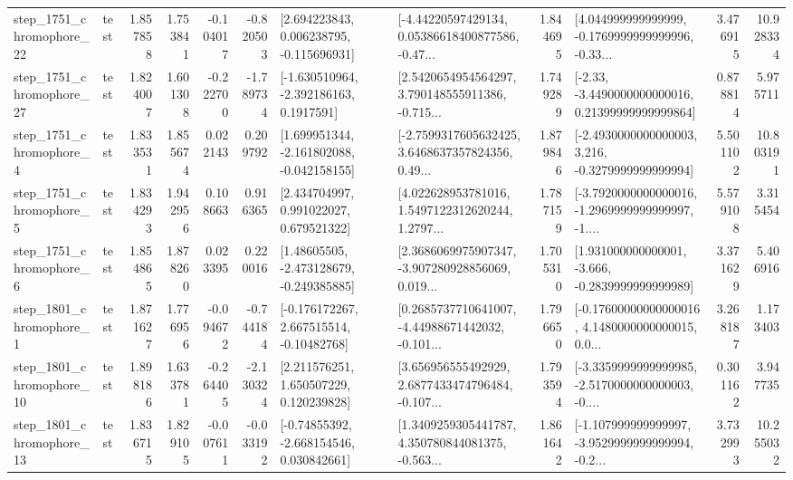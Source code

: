 \begin{tabular}{llrrrrllrlrr}
 step\_1751\_chromophore\_22 &      test &      1.857858 &    1.753841 &     -0.104017 & -0.820503 &    [2.694223843, 0.006238795, -0.115696931] &  [-4.44220597429134, 0.05386618400877586, -0.47... &       1.844695 &  [4.044999999999999, -0.1769999999999996, -0.33... &            3.476915 &         10.928334 \\
 step\_1751\_chromophore\_27 &      test &      1.824007 &    1.601308 &     -0.222700 & -1.789734 &     [-1.630510964, -2.392186163, 0.1917591] &  [2.5420654954564297, 3.790148555911386, -0.715... &       1.749289 &  [-2.33, -3.4490000000000016, 0.21399999999999864] &            0.878814 &          5.975711 \\
  step\_1751\_chromophore\_4 &      test &      1.833531 &    1.855674 &      0.022143 &  0.209792 &   [1.699951344, -2.161802088, -0.042158155] &  [-2.7599317605632425, 3.6468637357824356, 0.49... &       1.879846 &  [-2.4930000000000003, 3.216, -0.3279999999999994] &            5.501102 &         10.803191 \\
  step\_1751\_chromophore\_5 &      test &      1.834293 &    1.942956 &      0.108663 &  0.916365 &     [2.434704997, 0.991022027, 0.679521322] &  [4.022628953781016, 1.5497122312620244, 1.2797... &       1.787159 &  [-3.7920000000000016, -1.2969999999999997, -1.... &            5.579108 &          3.315454 \\
  step\_1751\_chromophore\_6 &      test &      1.854865 &    1.878260 &      0.023395 &  0.220016 &    [1.48605505, -2.473128679, -0.249385885] &  [2.3686069975907347, -3.907280928856069, 0.019... &       1.705310 &   [1.931000000000001, -3.666, -0.2839999999999989] &            3.371629 &          5.406916 \\
  step\_1801\_chromophore\_1 &      test &      1.871627 &    1.776956 &     -0.094672 & -0.744184 &    [-0.176172267, 2.667515514, -0.10482768] &  [0.2685737710641007, -4.44988671442032, -0.101... &       1.796650 &  [-0.17600000000000016, 4.1480000000000015, 0.0... &            3.268187 &          1.173403 \\
 step\_1801\_chromophore\_10 &      test &      1.898186 &    1.633781 &     -0.264405 & -2.130324 &     [2.211576251, 1.650507229, 0.120239828] &  [3.656956555492929, 2.6877433474796484, -0.107... &       1.793594 &  [-3.3359999999999985, -2.5170000000000003, -0.... &            0.301162 &          3.947735 \\
 step\_1801\_chromophore\_13 &      test &      1.836715 &    1.829105 &     -0.007611 & -0.033192 &    [-0.74855392, -2.668154546, 0.030842661] &  [1.3409259305441787, 4.350780844081375, -0.563... &       1.861642 &  [-1.107999999999997, -3.9529999999999994, -0.2... &            3.732993 &         10.255032 \\

\end{tabular}
